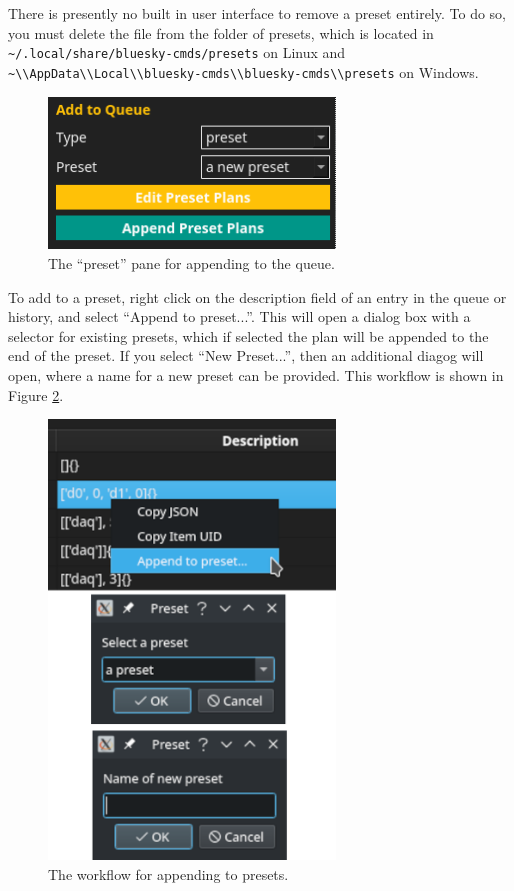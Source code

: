 There is presently no built in user interface to remove a preset entirely.
To do so, you must delete the file from the folder of presets, which is located in \nolinkurl{~/.local/share/bluesky-cmds/presets} on Linux and \nolinkurl{\~\\AppData\\Local\\bluesky-cmds\\bluesky-cmds\\presets} on Windows.


\begin{figure}
\includegraphics[width=3in]{"acquisition/images/preset"}
\caption[Preset Pane]{
	The ``preset'' pane for appending to the queue.
}
\label{acq:fig:preset}
\end{figure}

To add to a preset, right click on the description field of an entry in the queue or history, and select ``Append to preset...''.
This will open a dialog box with a selector for existing presets, which if selected the plan will be appended to the end of the preset.
If you select ``New Preset...'', then an additional diagog will open, where a name for a new preset can be provided.
This workflow is shown in Figure \ref{acq:fig:preset_add}.

\begin{figure}
\includegraphics[width=3in]{"acquisition/images/append_to_preset"}
\caption[Preset add]{
	The workflow for appending to presets.
}
\label{acq:fig:preset_add}
\end{figure}

